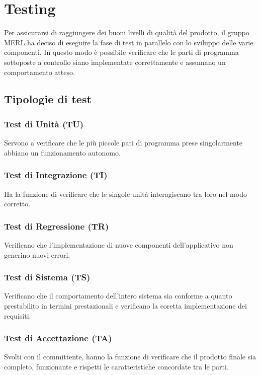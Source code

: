 \chapter{Testing}
Per assicurarsi di raggiungere dei buoni livelli di qualità del prodotto, il gruppo MERL ha deciso di eseguire la fase di test in parallelo con lo sviluppo delle varie componenti. In questo modo è possibile verificare che le parti di programma sottoposte a controllo siano implementate correttamente e assumano un comportamento atteso.
\section{Tipologie di test}
    \subsection{Test di Unità (TU)}  Servono a verificare che le più piccole pati di programma prese singolarmente abbiano un funzionamento autonomo.
    \subsection{Test di Integrazione (TI)} Ha la funzione di verificare che le singole unità interagiscano tra loro nel modo corretto.
    \subsection{Test di Regressione (TR)} Verificano che l'implementazione di nuove componenti dell'applicativo non generino nuovi errori.
    \subsection{Test di Sistema (TS)} Verificano che il comportamento dell'intero sistema sia conforme a quanto prestabilito in termini prestazionali e verificano la coretta implementazione dei requisiti.
    \subsection{Test di Accettazione (TA)} Svolti con il committente, hanno la funzione di verificare che il prodotto 
        finale sia completo, funzionante e rispetti le caratteristiche concordate tra le parti.


